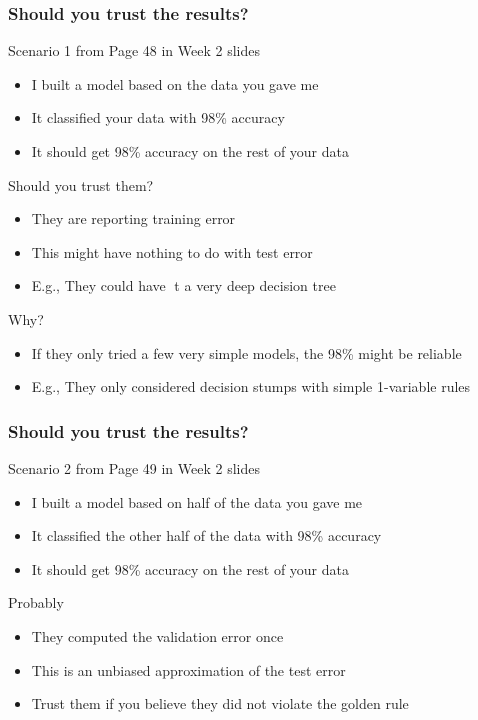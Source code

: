 \documentclass[aspectratio=169, 10pt]{beamer}
\begin{document}
\begin{frame}
    \frametitle{Should you trust the results?}

    Scenario 1 from Page 48 in Week 2 slides

    \begin{itemize}
        \item I built a model based on the data you gave me
        \item It classified your data with 98\% accuracy
        \item It should get 98\% accuracy on the rest of your data
    \end{itemize}

    Should you trust them?\\

    \begin{itemize}
        \item They are reporting training error
        \item This might have nothing to do with test error
        \item E.g., They could have t a very deep decision tree
    \end{itemize}

    Why?

    \begin{itemize}
        \item If they only tried a few very simple models, the 98\% might be reliable
        \item E.g., They only considered decision stumps with simple 1-variable rules
    \end{itemize}
    
\end{frame}

\begin{frame}
    \frametitle{Should you trust the results?}
    
    Scenario 2 from Page 49 in Week 2 slides

    \begin{itemize}
        \item I built a model based on half of the data you gave me
        \item It classified the other half of the data with 98\% accuracy
        \item It should get 98\% accuracy on the rest of your data
    \end{itemize}

    Probably

    \begin{itemize}
        \item They computed the validation error once
        \item This is an unbiased approximation of the test error
        \item Trust them if you believe they did not violate the golden rule
    \end{itemize}

\end{frame}
\end{document}
